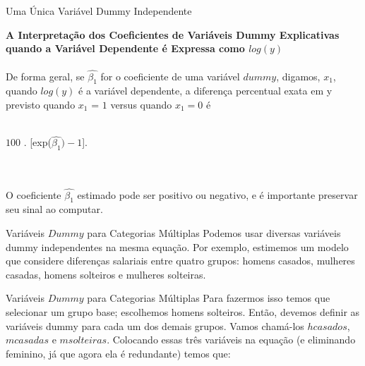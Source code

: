 \documentclass[t,14pt,mathserif]{beamer}
\begin{document}
\begin{frame}{Uma Única Variável Dummy Independente}
		\justifying
		\begin{tcolorbox}
			\indent\textbf{\small{A Interpretação dos Coeficientes de Variáveis Dummy Explicativas quando a Variável Dependente é Expressa como $log(y)$}} \\
		\\ \small {De forma geral, se $\hat{\beta_{1}}$ for o coeficiente de uma variável $dummy$, digamos, $x_1$, quando $log(y)$ é a variável dependente, a diferença percentual exata em y previsto quando $x_1$ = $1$ versus quando $x_1 = 0$ é}\\
		\\\centerline{ \small{ $100$ . [exp($\hat{\beta_{1}}) - 1$].}}\\ 
	   	\\ \small{O coeficiente $\hat{\beta_{1}}$ estimado pode ser positivo ou negativo, e é importante preservar seu sinal ao computar}.
		\end{tcolorbox}
	\end{frame}



{
\begin{frame}{Variáveis $Dummy$ para Categorias Múltiplas}
		\justifying
		\vfill 
		Podemos usar diversas variáveis dummy independentes na mesma equação. 
		\vfill
       Por exemplo, estimemos um modelo que considere diferenças salariais entre quatro grupos: homens casados, mulheres casadas, homens solteiros e mulheres solteiras.
		\vfill
       
\end{frame}
} 

{
\begin{frame}{Variáveis $Dummy$ para Categorias Múltiplas}
		\justifying
		\vfill 
		Para fazermos isso temos que selecionar um grupo base; escolhemos homens solteiros. 
		\vfill
       Então, devemos definir as variáveis dummy para cada um dos demais grupos. Vamos chamá-los $hcasados$, $mcasadas$ e $msolteiras$.
       \vfill 
	    Colocando essas três variáveis na equação (e eliminando feminino, já que agora ela é redundante) temos que:
		\vfill
       
\end{frame}
} 
\end{document}
